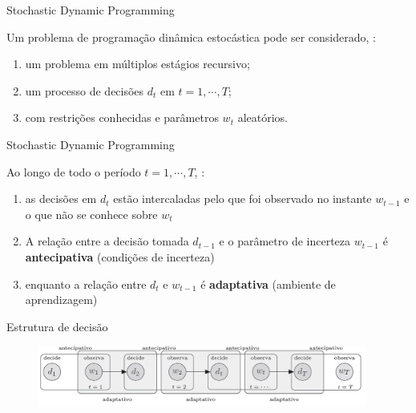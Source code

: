 \documentclass{beamer}
\begin{document}
\begin{frame}{Stochastic Dynamic Programming}

Um problema de programação dinâmica estocástica pode ser considerado, \citep{Consigli1998}:

\begin{enumerate}
\item um problema em múltiplos estágios recursivo;
\item um processo de decisões $d_t$ em $t=1,\cdots,T$;
\item com restrições conhecidas e parâmetros $w_t$ aleatórios. 
\end{enumerate}

\end{frame}



\begin{frame}{Stochastic Dynamic Programming}

Ao longo de todo o período $t=1,\cdots,T$, \citep{Kouwenberg2008}:

\begin{enumerate}
\item as decisões em $d_t$ estão intercaladas pelo que foi observado no instante $w_{t-1}$ e o que não se conhece sobre $w_{t}$
\item A relação entre a decisão tomada $d_{t-1}$ e o parâmetro de incerteza $w_{t-1}$ é \textbf{antecipativa} (condições de incerteza)
\item enquanto a relação entre $d_t$ e $w_{t-1}$ é \textbf{adaptativa} (ambiente de aprendizagem)
\end{enumerate} 

\end{frame}


\begin{frame}{Estrutura de decisão}
\begin{figure}
\begin{center}
 \includegraphics[height=2cm,keepaspectratio]{processo_adapt_antecipa.png}
 \end{center}
\label{fig:sadsad}
\end{figure}

\end{frame}
\end{document}
